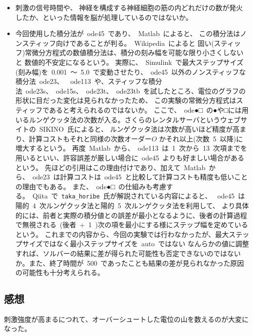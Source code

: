 \documentclass[10pt]{jarticle}
\begin{document}
\begin{itemize}
	\setlength{\leftskip}{7.5cm}
	\item[● ニューロンモデルの情報の符号化について] 刺激の信号時間や、
		神経を構成する神経細胞の筋の内どれだけの数が発火したか、といった情報を脳が処理しているのではないか。
	\item[● 数値積分法や積分の刻み幅の影響について] 今回使用した積分法が\ ode45\ であり、\ Matlab\ によると、
		この積分法はノンスティッフ向けであることが判る\cite{kkadai141}。\ Wikipedia\ によると
		固い(スティッフ)常微分方程式の数値積分法は、積分の刻み幅を可能な限り小さくしないと
		数値的不安定になるという\cite{kkadai142}。
		実際に、\ Simulink\ で最大ステップサイズ(刻み幅)を\ 0.001\ ～\ 5.0\ で変動させたり、\ ode45\ 以外のノンスティッフな積分法\ ode23、\ 
		\ ode113\ や、スティッフな積分法\ ode23s、\ ode15s、\ ode23t、\ ode23tb\ を試したところ、電位のグラフの形状に目だった変化は見られなかったため、
		この実験の常微分方程式はスティッフであると考えられるのではないか。
		ここで、\ ode●□\ の●や□には用いるルンゲクッタ法の次数が入る。さくらのレンタルサーバというウェブサイトの\ SIKINO\ 氏によると、
		ルンゲクッタ法は次数が高いほど精度が高まり、計算コストもそれと同様の次数オーダー$ O $
		かそれ以上(次数\ 5\ 以降)に増大するという\cite{kkadai144}。
		再度\ Matlab\ から、\ ode113\ は\ 1\ 次から\ 13\ 次項までを用いるといい、許容誤差が厳しい場合に\ ode45\ よりも好ましい場合があるという\cite{kkadai143}。
		先ほどの引用はこの理由付けであり、加えて\ Matlab\ から、\ ode23\ は計算コストは\ ode45\ と比較して計算コストも精度も低いことの理由でもある\cite{kkadai141}。
		また、\ ode●□\ の仕組みも考慮する。\ Qiita\ で\ \verb|taka_horibe|\ 氏が解説されている内容によると、
		\ ode45\ は陽的\ 4\ 次ルンゲクッタ法と陽的\ 5\ 次ルンゲクッタ法を利用して、
		より具体的には、前者と実際の積分値との誤差が最小となるように、後者の計算過程で無視される\ (後者\ +\ 1\ )次の項を最小にする様にステップ幅を定めているという\cite{kkadai145}。
		これまでの内容から、今回の実験では行わなかったが、最大ステップサイズではなく最小ステップサイズを\ auto\ ではない
		なんらかの値に調整すれば、ソルバーの結果に差が得られた可能性も否定できないのではないか。また、終了時間が\ 500\ であったことも結果の差が見られなかった原因
		の可能性も十分考えられる。

\end{itemize}
%

\subsection{感想}
%
刺激強度が高まるにつれて、オーバーシュートした電位の山を数えるのが大変になった。
%
\end{document}
